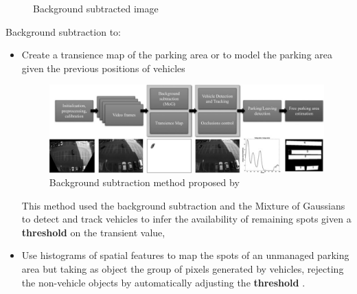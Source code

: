 \documentclass{beamer}
\begin{document}
\begin{frame}[allowframebreaks]
\begin{figure}[!htbp]
\begin{minipage}[b]{0.48\textwidth}
		\caption{Background subtracted image}
		\label{background}
	\end{minipage}
\end{figure}
\vspace{5cm}
Background subtraction to:
\begin{itemize}
	\item Create a transience map of the parking area or to model the parking area given the previous positions of vehicles \cite{Postigo}
	\begin{figure}
		\includegraphics[width=300pt]{Pictures/transmap}
		\caption{Background subtraction method proposed by \cite{Postigo}}
	\end{figure}
	This method used the background subtraction and the Mixture of Gaussians to detect and track vehicles to infer the availability of remaining spots given a \textbf{threshold} on the transient value, 
	\item Use histograms of spatial features to map the spots of an unmanaged parking area but taking as object the group of pixels generated by vehicles, rejecting the non-vehicle objects by automatically adjusting the \textbf{threshold} \cite{Choeychuen}.
\end{itemize}


\end{frame}
\end{document}
